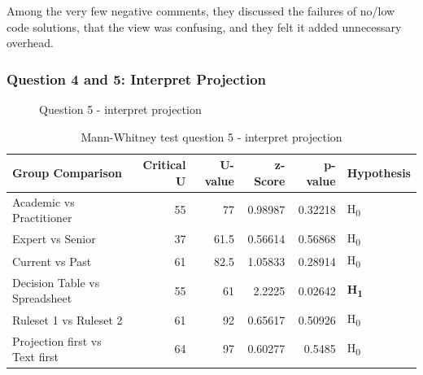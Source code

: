 Among the very few negative comments, they discussed the failures of no/low code solutions, that the view was confusing, and they felt it added unnecessary overhead.

\subsubsection{Question 4 and 5: Interpret Projection}

\begin{figure}
    \centering
    \caption{Question 5 - interpret projection}
    \label{fig:stackedbar_Q2}
\end{figure}

\begin{table}
    \begin{center}
        \begin{tabular}{ |l ||r |r |r | r|l | } 
            \hline
            Group Comparison                 & Critical U & U-value & z-Score  & p-value & Hypothesis         \\
            \hline
            \hline
            Academic vs Practitioner         & 55        & 77      &  0.98987  & 0.32218 & H\textsubscript{0} \\ 
            \hline
            Expert vs Senior                 & 37        & 61.5    &  0.56614  & 0.56868 & H\textsubscript{0} \\ 
            \hline
            Current vs Past                  & 61        & 82.5    &  1.05833  & 0.28914 & H\textsubscript{0} \\ 
            \hline
            Decision Table vs Spreadsheet    & 55        & 61      &  2.2225   & 0.02642 & \textbf{H\textsubscript{1}}  \\ 
            \hline
            Ruleset 1 vs Ruleset 2           & 61        & 92      &  0.65617  & 0.50926 & H\textsubscript{0} \\ 
            \hline
            Projection first vs Text first   & 64        & 97      &  0.60277  & 0.5485  & H\textsubscript{0} \\ 
            \hline
        \end{tabular}
    \end{center}
    \caption{Mann-Whitney test question 5 - interpret projection}
    \label{table:mannwhitneyQ2}
\end{table}

